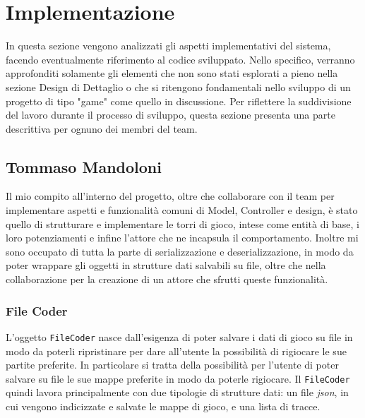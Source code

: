 \newpage
\section{Implementazione}
In questa sezione vengono analizzati gli aspetti implementativi del sistema, facendo eventualmente riferimento al codice
sviluppato. Nello specifico, verranno approfonditi solamente gli elementi che non sono stati esplorati a pieno nella
sezione Design di Dettaglio o che si ritengono fondamentali nello sviluppo di un progetto di tipo "game" come quello in
discussione. Per riflettere la suddivisione del lavoro durante il processo di sviluppo, questa sezione presenta una
parte descrittiva per ognuno dei membri del team.

\subsection{Tommaso Mandoloni}
Il mio compito all'interno del progetto, oltre che collaborare con il team per implementare aspetti e funzionalità
comuni di Model, Controller e design, è stato quello di strutturare e implementare le torri di gioco, intese come entità
di base, i loro potenziamenti e infine l'attore che ne incapsula il comportamento. Inoltre mi sono occupato di tutta
la parte di serializzazione e deserializzazione, in modo da poter wrappare gli oggetti in strutture dati salvabili su
file, oltre che nella collaborazione per la creazione di un attore che sfrutti queste funzionalità.

\subsubsection{File Coder}
L'oggetto \texttt{FileCoder} nasce dall'esigenza di poter salvare i dati di gioco su file in modo da poterli
ripristinare per dare all'utente la possibilità di rigiocare le sue partite preferite. In particolare si tratta della
possibilità per l'utente di poter salvare su file le sue mappe preferite in modo da poterle rigiocare. Il
\texttt{FileCoder} quindi lavora principalmente con due tipologie di strutture dati: un file \textit{json}, in cui
vengono indicizzate e salvate le mappe di gioco, e una lista di tracce.

